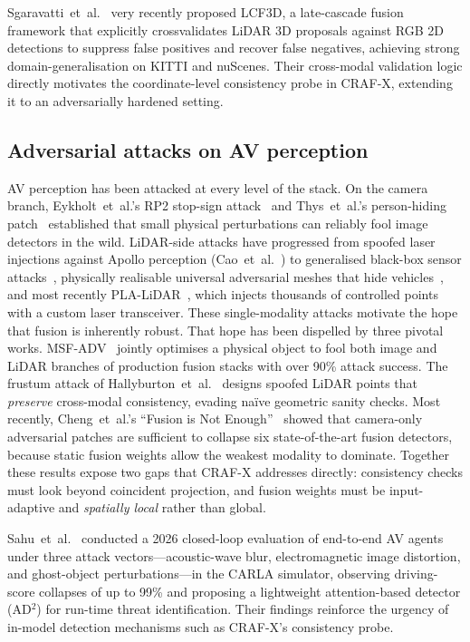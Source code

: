 Sgaravatti~et~al.~\cite{SgaravattiLCF3D2026} very recently proposed LCF3D,
a late-cascade fusion framework that explicitly crossvalidates LiDAR
3D proposals against RGB 2D detections to suppress false positives and
recover false negatives, achieving strong domain-generalisation on KITTI
and nuScenes. Their cross-modal validation logic directly motivates the
coordinate-level consistency probe in CRAF-X, extending it to an
adversarially hardened setting.

\subsection{Adversarial attacks on AV perception}

AV perception has been attacked at every level of the stack. On the
camera branch, Eykholt~et~al.'s RP2 stop-sign
attack~\cite{EykholtRP22018} and Thys~et~al.'s person-hiding
patch~\cite{ThysPatch2019} established that small physical perturbations
can reliably fool image detectors in the wild. LiDAR-side attacks have
progressed from spoofed laser injections against Apollo perception
(Cao~et~al.~\cite{CaoAdvLiDAR2019}) to generalised black-box sensor
attacks~\cite{SunUSENIX2020}, physically realisable universal adversarial
meshes that hide vehicles~\cite{TuPhysical2020}, and most recently
PLA-LiDAR~\cite{JinPLALiDAR2023}, which injects thousands of
controlled points with a custom laser transceiver. These single-modality
attacks motivate the hope that fusion is inherently robust.
That hope has been dispelled by three pivotal works. MSF-ADV~\cite{CaoMSFADV2021}
jointly optimises a physical object to fool both image and LiDAR
branches of production fusion stacks with over 90\% attack success. The
frustum attack of Hallyburton~et~al.~\cite{HallyburtonFrustum2022}
designs spoofed LiDAR points that \emph{preserve} cross-modal
consistency, evading na\"{i}ve geometric sanity checks. Most recently,
Cheng~et~al.'s ``Fusion is Not Enough''~\cite{ChengFusion2024} showed
that camera-only adversarial patches are sufficient to collapse six
state-of-the-art fusion detectors, because static fusion weights allow
the weakest modality to dominate. Together these results expose two
gaps that CRAF-X addresses directly: consistency checks must look beyond
coincident projection, and fusion weights must be input-adaptive and
\emph{spatially local} rather than global.

Sahu~et~al.~\cite{SahuAD22026} conducted a 2026 closed-loop evaluation
of end-to-end AV agents under three attack vectors---acoustic-wave blur,
electromagnetic image distortion, and ghost-object perturbations---in the
CARLA simulator, observing driving-score collapses of up to 99\% and
proposing a lightweight attention-based detector (AD$^2$) for run-time
threat identification. Their findings reinforce the urgency of in-model
detection mechanisms such as CRAF-X's consistency probe.

